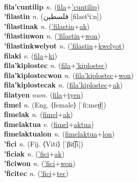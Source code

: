  \label{fila'cosawnwon} \\
\textbf{fila'cuntilip} \textit{n.} (\hyperref[fila]{fila}+\hyperref['cuntilip]{'cuntilip})
 \label{fila'cuntilip} \\
\textbf{'filastin} \textit{n.} ({\arabics{}فلسطين} [filastˁiːn])
 \label{'filastin} \\
\textbf{'filastinak} \textit{n.} (\hyperref['filastin]{'filastin}+\hyperref[ak]{ak})
 \label{'filastinak} \\
\textbf{'filastinwon} \textit{n.} (\hyperref['filastin]{'filastin}+\hyperref[won]{won})
 \label{'filastinwon} \\
\textbf{'filastinkwelyot} \textit{n.} (\hyperref['filastin]{'filastin}+\hyperref[kwelyot]{kwelyot})
 \label{'filastinkwelyot} \\
\textbf{filaki} \textit{v.} (\hyperref[fila]{fila}+\hyperref[ki]{ki})
 \label{filaki} \\
\textbf{fila'kiplostec} \textit{n.} (\hyperref[fila]{fila}+\hyperref['kiplostec]{'kiplostec})
 \label{fila'kiplostec} \\
\textbf{fila'kiplostecwon} \textit{n.} (\hyperref[fila'kiplostec]{fila'kiplostec}+\hyperref[won]{won})
 \label{fila'kiplostecwon} \\
\textbf{fila'kiplostecak} \textit{n.} (\hyperref[fila'kiplostec]{fila'kiplostec}+\hyperref[ak]{ak})
 \label{fila'kiplostecak} \\
\textbf{filatyen} \textit{num.} (\hyperref[fila]{fila}+\hyperref[tyen]{tyen})
 \label{filatyen} \\
\textbf{fimel} \textit{n.} (Eng. ⟨female⟩ [ˈfiːmeɪ̯ɫ])
 \label{fimel} \\
\textbf{fimelak} \textit{n.} (\hyperref[fimel]{fimel}+\hyperref[ak]{ak})
 \label{fimelak} \\
\textbf{fimelaktua} \textit{v.} (\hyperref[fimel]{fimel}+\hyperref[aktua]{aktua})
 \label{fimelaktua} \\
\textbf{fimelaktualon} \textit{n.} (\hyperref[fimelaktua]{fimelaktua}+\hyperref[lon]{lon})
 \label{fimelaktualon} \\
\textbf{'fici} \textit{n.} (Fij. ⟨Viti⟩ [ˈβit͡ʃi])
 \label{'fici} \\
\textbf{'ficiak} \textit{n.} (\hyperref['fici]{'fici}+\hyperref[ak]{ak})
 \label{'ficiak} \\
\textbf{'ficiwon} \textit{n.} (\hyperref['fici]{'fici}+\hyperref[won]{won})
 \label{'ficiwon} \\
\textbf{'ficitec} \textit{n.} (\hyperref['fici]{'fici}+\hyperref[tec]{tec})
 \label{'ficitec} \\
